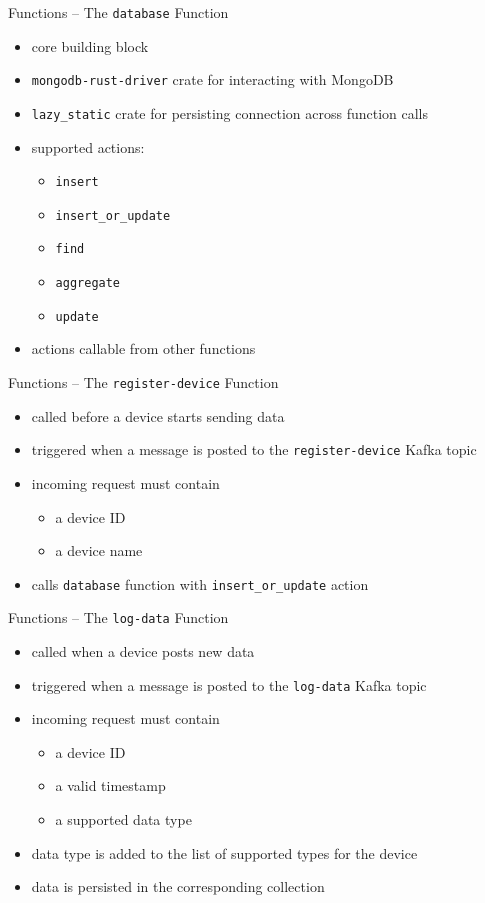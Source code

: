 \begin{frame}{Functions -- The \texttt{database} Function}
  \begin{itemize}
    \item core building block
    \item \texttt{mongodb-rust-driver} crate for interacting with MongoDB
    \item \texttt{lazy\_static} crate for persisting connection across function calls
    \item supported actions:
      \begin{itemize}
        \item \texttt{insert}
        \item \texttt{insert\_or\_update}
        \item \texttt{find}
        \item \texttt{aggregate}
        \item \texttt{update}
      \end{itemize}
    \item actions callable from other functions
  \end{itemize}
\end{frame}

\begin{frame}{Functions -- The \texttt{register-device} Function}
  \begin{itemize}
    \item called before a device starts sending data
    \item triggered when a message is posted to the \texttt{register-device} Kafka topic
    \item incoming request must contain
      \begin{itemize}
        \item a device ID
        \item a device name
      \end{itemize}
    \item calls \texttt{database} function with \texttt{insert\_or\_update} action
  \end{itemize}
\end{frame}

\begin{frame}{Functions -- The \texttt{log-data} Function}
  \begin{itemize}
    \item called when a device posts new data
    \item triggered when a message is posted to the \texttt{log-data} Kafka topic
    \item incoming request must contain
      \begin{itemize}
        \item a device ID
        \item a valid timestamp
        \item a supported data type
      \end{itemize}
    \item data type is added to the list of supported types for the device
    \item data is persisted in the corresponding collection
  \end{itemize}
\end{frame}

